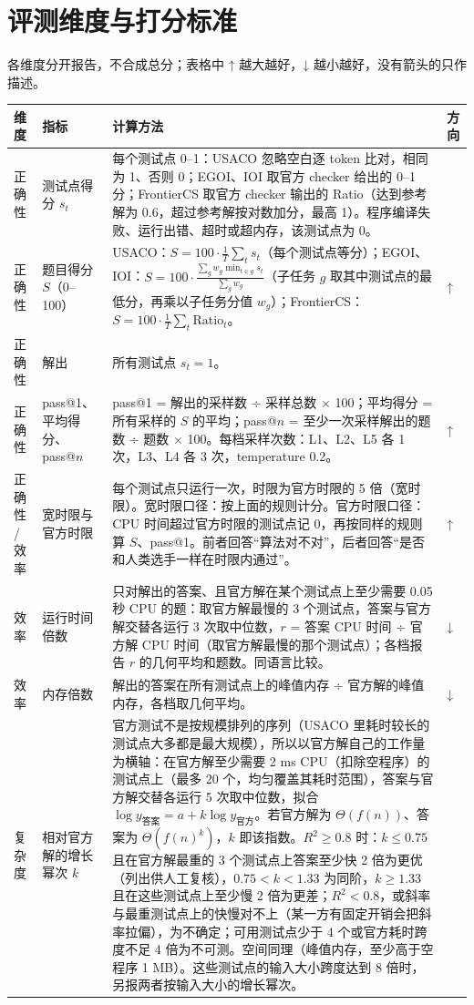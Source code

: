 \documentclass[11pt,a4paper,fontset=none]{ctexart}
\begin{document}
\section{评测维度与打分标准}
各维度分开报告，不合成总分；表格中 ↑ 越大越好，↓ 越小越好，没有箭头的只作描述。
{\small\begin{longtable}{@{}p{1.6cm}p{2.6cm}p{9.9cm}p{1.2cm}@{}}
\toprule 维度 & 指标 & 计算方法 & 方向 \\ \midrule \endhead
正确性 & 测试点得分 $s_t$ & 每个测试点 0–1：USACO 忽略空白逐 token 比对，相同为 1、否则 0；EGOI、IOI 取官方 checker 给出的 0–1 分；FrontierCS 取官方 checker 输出的 Ratio（达到参考解为 0.6，超过参考解按对数加分，最高 1）。程序编译失败、运行出错、超时或超内存，该测试点为 0。 &  \\
正确性 & 题目得分 $S$（0–100） & USACO：$S = 100 \cdot \frac{1}{T}\sum_t s_t$（每个测试点等分）；EGOI、IOI：$S = 100 \cdot \frac{\sum_g w_g \min_{t \in g} s_t}{\sum_g w_g}$（子任务 $g$ 取其中测试点的最低分，再乘以子任务分值 $w_g$）；FrontierCS：$S = 100 \cdot \frac{1}{T}\sum_t \mathrm{Ratio}_t$。 & ↑ \\
正确性 & 解出 & 所有测试点 $s_t = 1$。 &  \\
正确性 & pass@1、平均得分、pass@$n$ & pass@1 = 解出的采样数 ÷ 采样总数 × 100；平均得分 = 所有采样的 $S$ 的平均；pass@$n$ = 至少一次采样解出的题数 ÷ 题数 × 100。每档采样次数：L1、L2、L5 各 1 次，L3、L4 各 3 次，temperature 0.2。 & ↑ \\
正确性 / 效率 & 宽时限与官方时限 & 每个测试点只运行一次，时限为官方时限的 5 倍（宽时限）。宽时限口径：按上面的规则计分。官方时限口径：CPU 时间超过官方时限的测试点记 0，再按同样的规则算 $S$、pass@1。前者回答“算法对不对”，后者回答“是否和人类选手一样在时限内通过”。 & ↑ \\
效率 & 运行时间倍数 & 只对解出的答案、且官方解在某个测试点上至少需要 0.05 秒 CPU 的题：取官方解最慢的 3 个测试点，答案与官方解交替各运行 3 次取中位数，$r$ = 答案 CPU 时间 ÷ 官方解 CPU 时间（取官方解最慢的那个测试点）；各档报告 $r$ 的几何平均和题数。同语言比较。 & ↓ \\
效率 & 内存倍数 & 解出的答案在所有测试点上的峰值内存 ÷ 官方解的峰值内存，各档取几何平均。 & ↓ \\
复杂度 & 相对官方解的增长幂次 $k$ & 官方测试不是按规模排列的序列（USACO 里耗时较长的测试点大多都是最大规模），所以以官方解自己的工作量为横轴：在官方解至少需要 2 ms CPU（扣除空程序）的测试点上（最多 20 个，均匀覆盖其耗时范围），答案与官方解交替各运行 5 次取中位数，拟合 $\log y_{\text{答案}} = a + k \log y_{\text{官方}}$。若官方解为 $\Theta(f(n))$、答案为 $\Theta(f(n)^k)$，$k$ 即该指数。$R^2 \ge 0.8$ 时：$k \le 0.75$ 且在官方解最重的 3 个测试点上答案至少快 2 倍为更优（列出供人工复核），$0.75 < k < 1.33$ 为同阶，$k \ge 1.33$ 且在这些测试点上至少慢 2 倍为更差；$R^2 < 0.8$，或斜率与最重测试点上的快慢对不上（某一方有固定开销会把斜率拉偏），为不确定；可用测试点少于 4 个或官方耗时跨度不足 4 倍为不可测。空间同理（峰值内存，至少高于空程序 1 MB）。这些测试点的输入大小跨度达到 8 倍时，另报两者按输入大小的增长幂次。 &  \\

\end{longtable}}
\end{document}

